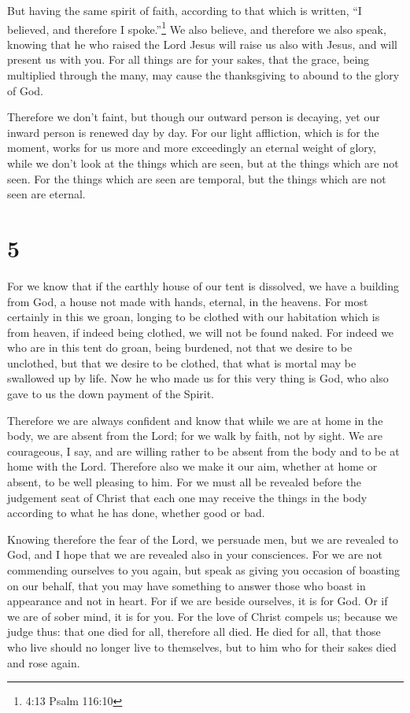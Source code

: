 But having the same spirit of faith, according to that
which is written, ``I believed, and therefore I spoke.''\footnote{4:13
  Psalm 116:10} We also believe, and therefore we also speak,
 knowing that he who raised the Lord Jesus will raise us
also with Jesus, and will present us with you.  For all
things are for your sakes, that the grace, being multiplied through the
many, may cause the thanksgiving to abound to the glory of God.

 Therefore we don't faint, but though our outward person is
decaying, yet our inward person is renewed day by day.  For
our light affliction, which is for the moment, works for us more and
more exceedingly an eternal weight of glory,  while we
don't look at the things which are seen, but at the things which are not
seen. For the things which are seen are temporal, but the things which
are not seen are eternal.

\hypertarget{section-4}{%
\section{5}\label{section-4}}

 For we know that if the earthly house of our tent is
dissolved, we have a building from God, a house not made with hands,
eternal, in the heavens.  For most certainly in this we
groan, longing to be clothed with our habitation which is from heaven,
 if indeed being clothed, we will not be found naked.
 For indeed we who are in this tent do groan, being
burdened, not that we desire to be unclothed, but that we desire to be
clothed, that what is mortal may be swallowed up by life. 
Now he who made us for this very thing is God, who also gave to us the
down payment of the Spirit.

 Therefore we are always confident and know that while we
are at home in the body, we are absent from the Lord;  for
we walk by faith, not by sight.  We are courageous, I say,
and are willing rather to be absent from the body and to be at home with
the Lord.  Therefore also we make it our aim, whether at
home or absent, to be well pleasing to him.  For we must
all be revealed before the judgement seat of Christ that each one may
receive the things in the body according to what he has done, whether
good or bad.

 Knowing therefore the fear of the Lord, we persuade men,
but we are revealed to God, and I hope that we are revealed also in your
consciences.  For we are not commending ourselves to you
again, but speak as giving you occasion of boasting on our behalf, that
you may have something to answer those who boast in appearance and not
in heart.  For if we are beside ourselves, it is for God.
Or if we are of sober mind, it is for you.  For the love of
Christ compels us; because we judge thus: that one died for all,
therefore all died.  He died for all, that those who live
should no longer live to themselves, but to him who for their sakes died
and rose again.

